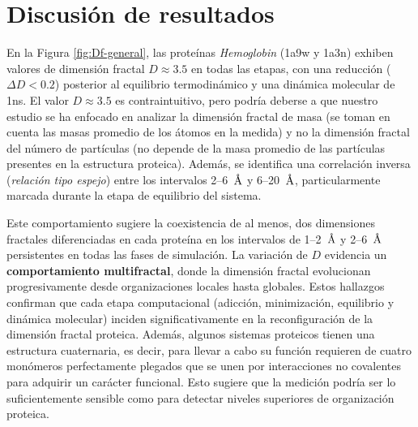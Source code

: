 	
	
	\section{Discusi\'{o}n de resultados}	
	
	En la Figura \ref{fig:Df-general}, las prote\'{i}nas \textit{Hemoglobin} (1a9w y 1a3n) exhiben valores de dimensi\'{o}n fractal $D \approx 3.5$ en todas las etapas, con una reducci\'{o}n  ($\Delta D < 0.2$) posterior al equilibrio termodin\'{a}mico y una din\'{a}mica molecular de 1ns. El valor $D \approx 3.5$  es contraintuitivo, pero podr\'{i}a deberse a que nuestro estudio se ha enfocado en analizar la dimensi\'{o}n fractal de masa (se toman en cuenta las masas promedio de los \'{a}tomos en la medida) y no la dimensi\'{o}n fractal del número de part\'{i}culas (no depende de la masa promedio de las part\'{i}culas presentes en la estructura proteica). Adem\'{a}s, se identifica una correlaci\'{o}n inversa (\emph{relaci\'{o}n tipo espejo}) entre los intervalos 2--6~$\textup{\r{A}}$ y 6--20~$\textup{\r{A}}$, particularmente marcada durante la etapa de equilibrio del sistema.
	
	Este comportamiento sugiere la coexistencia de al menos, dos dimensiones fractales diferenciadas en cada prote\'{i}na en los intervalos de 1--2~$\textup{\r{A}}$ y 2--6~$\textup{\r{A}}$ persistentes en todas las fases de simulaci\'{o}n. La variaci\'{o}n de $D$ evidencia un \textbf{comportamiento multifractal}, donde la dimensi\'{o}n fractal evolucionan progresivamente desde organizaciones locales hasta globales. Estos hallazgos confirman que cada etapa computacional (adicci\'{o}n, minimizaci\'{o}n, equilibrio y din\'{a}mica molecular) inciden significativamente en la reconfiguraci\'{o}n de la dimensi\'{o}n fractal proteica. Adem\'{a}s, algunos sistemas proteicos tienen una estructura cuaternaria, es decir, para llevar a cabo su función requieren de cuatro mon\'{o}meros perfectamente plegados que se unen por interacciones no covalentes para adquirir un car\'{a}cter funcional. Esto sugiere que la medición podría ser lo suficientemente sensible como para detectar niveles superiores de organización proteica.
	
